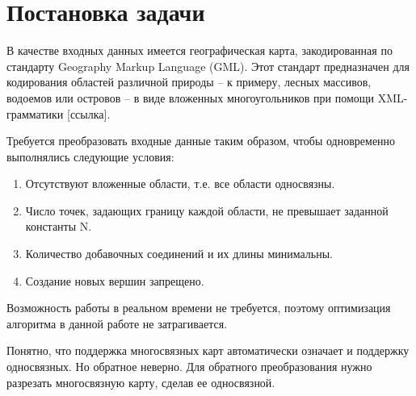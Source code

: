 \section{Постановка задачи}
\label{}

В качестве входных данных имеется географическая карта, закодированная по стандарту Geography Markup Language (GML). Этот стандарт предназначен для кодирования областей различной природы – к примеру, лесных массивов, водоемов или островов – в виде вложенных многоугольников при помощи XML-грамматики [ссылка]. 

Требуется преобразовать входные данные таким образом, чтобы одновременно выполнялись следующие условия:

\begin{enumerate}
\item Отсутствуют вложенные области, т.е. все области односвязны.
\item Число точек, задающих границу каждой области, не превышает заданной константы N.
\item Количество добавочных соединений и их длины минимальны.
\item Создание новых вершин запрещено.
\end{enumerate}

Возможность работы в реальном времени не требуется, поэтому оптимизация алгоритма в данной работе не затрагивается.

Понятно, что поддержка многосвязных карт автоматически означает и поддержку односвязных. Но обратное неверно. Для обратного преобразования нужно разрезать многосвязную карту, сделав ее односвязной.